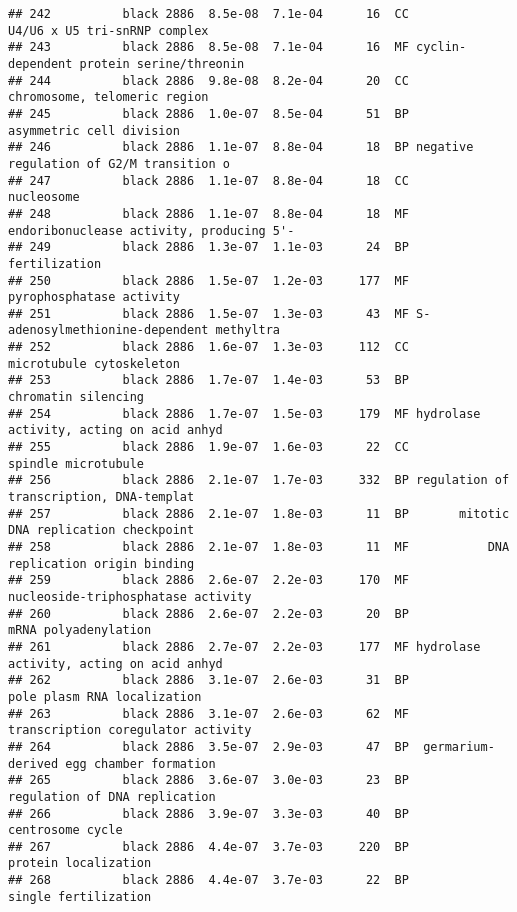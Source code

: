 \documentclass[]{article}
\begin{document}
\begin{verbatim}
## 242          black 2886  8.5e-08  7.1e-04      16  CC             U4/U6 x U5 tri-snRNP complex
## 243          black 2886  8.5e-08  7.1e-04      16  MF cyclin-dependent protein serine/threonin
## 244          black 2886  9.8e-08  8.2e-04      20  CC             chromosome, telomeric region
## 245          black 2886  1.0e-07  8.5e-04      51  BP                 asymmetric cell division
## 246          black 2886  1.1e-07  8.8e-04      18  BP negative regulation of G2/M transition o
## 247          black 2886  1.1e-07  8.8e-04      18  CC                               nucleosome
## 248          black 2886  1.1e-07  8.8e-04      18  MF endoribonuclease activity, producing 5'-
## 249          black 2886  1.3e-07  1.1e-03      24  BP                            fertilization
## 250          black 2886  1.5e-07  1.2e-03     177  MF                 pyrophosphatase activity
## 251          black 2886  1.5e-07  1.3e-03      43  MF S-adenosylmethionine-dependent methyltra
## 252          black 2886  1.6e-07  1.3e-03     112  CC                 microtubule cytoskeleton
## 253          black 2886  1.7e-07  1.4e-03      53  BP                      chromatin silencing
## 254          black 2886  1.7e-07  1.5e-03     179  MF hydrolase activity, acting on acid anhyd
## 255          black 2886  1.9e-07  1.6e-03      22  CC                      spindle microtubule
## 256          black 2886  2.1e-07  1.7e-03     332  BP regulation of transcription, DNA-templat
## 257          black 2886  2.1e-07  1.8e-03      11  BP       mitotic DNA replication checkpoint
## 258          black 2886  2.1e-07  1.8e-03      11  MF           DNA replication origin binding
## 259          black 2886  2.6e-07  2.2e-03     170  MF       nucleoside-triphosphatase activity
## 260          black 2886  2.6e-07  2.2e-03      20  BP                     mRNA polyadenylation
## 261          black 2886  2.7e-07  2.2e-03     177  MF hydrolase activity, acting on acid anhyd
## 262          black 2886  3.1e-07  2.6e-03      31  BP              pole plasm RNA localization
## 263          black 2886  3.1e-07  2.6e-03      62  MF       transcription coregulator activity
## 264          black 2886  3.5e-07  2.9e-03      47  BP  germarium-derived egg chamber formation
## 265          black 2886  3.6e-07  3.0e-03      23  BP            regulation of DNA replication
## 266          black 2886  3.9e-07  3.3e-03      40  BP                         centrosome cycle
## 267          black 2886  4.4e-07  3.7e-03     220  BP                     protein localization
## 268          black 2886  4.4e-07  3.7e-03      22  BP                     single fertilization

\end{verbatim}
\end{document}
